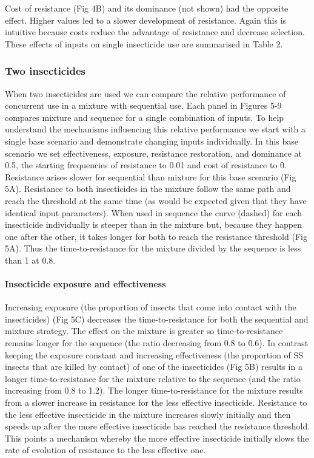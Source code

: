 \documentclass[11pt,]{article}
\let\oldparagraph\paragraph
\renewcommand{\paragraph}[1]{\oldparagraph{#1}\mbox{}}
\begin{document}
Cost of resistance (Fig 4B) and its dominance (not shown) had the
opposite effect. Higher values led to a slower development of
resistance. Again this is intuitive because costs reduce the advantage
of resistance and decrease selection. These effects of inputs on single
insecticide use are summarised in Table 2.

\subsubsection{Two insecticides}\label{two-insecticides}

When two insecticides are used we can compare the relative performance
of concurrent use in a mixture with sequential use. Each panel in
Figures 5-9 compares mixture and sequence for a single combination of
inputs. To help understand the mechanisms influencing this relative
performance we start with a single base scenario and demonstrate
changing inputs individually. In this base scenario we set
effectiveness, exposure, resistance restoration, and dominance at 0.5,
the starting frequencies of resistance to 0.01 and cost of resistance to
0. Resistance arises slower for sequential than mixture for this base
scenario (Fig 5A). Resistance to both insecticides in the mixture follow
the same path and reach the threshold at the same time (as would be
expected given that they have identical input parameters). When used in
sequence the curve (dashed) for each insecticide individually is steeper
than in the mixture but, because they happen one after the other, it
takes longer for both to reach the resistance threshold (Fig 5A). Thus
the time-to-resistance for the mixture divided by the sequence is less
than 1 at 0.8.

\paragraph{Insecticide exposure and
effectiveness}\label{insecticide-exposure-and-effectiveness}

Increasing exposure (the proportion of insects that come into contact
with the insecticides) (Fig 5C) decreases the time-to-resistance for
both the sequential and mixture strategy. The effect on the mixture is
greater so time-to-resistance remains longer for the sequence (the ratio
decreasing from 0.8 to 0.6). In contrast keeping the exposure constant
and increasing effectiveness (the proportion of SS insects that are
killed by contact) of one of the insecticides (Fig 5B) results in a
longer time-to-resistance for the mixture relative to the sequence (and
the ratio increasing from 0.8 to 1.2). The longer time-to-resistance for
the mixture results from a slower increase in resistance for the less
effective insecticide. Resistance to the less effective insecticide in
the mixture increases slowly initially and then speeds up after the more
effective insecticide has reached the resistance threshold. This points
a mechanism whereby the more effective insecticide initially slows the
rate of evolution of resistance to the less effective one.
\end{document}
